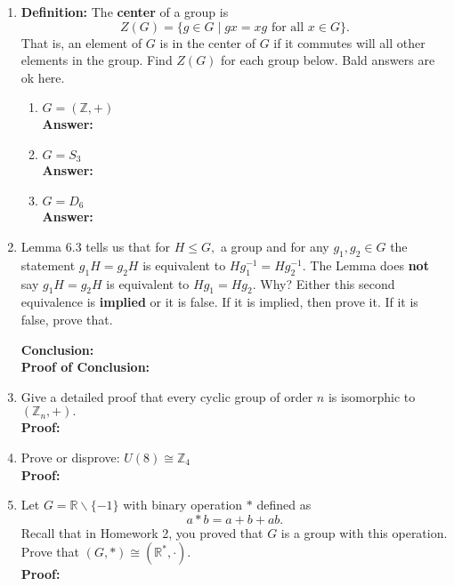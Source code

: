 \documentclass[12pt]{article}
\renewcommand{\emph}[1]{\textsf{\textbf{#1}}}
\newcommand{\bbZ}{\mathbb{Z}}
\newcommand{\bbR}{\mathbb{R}}
\begin{document}
\begin{enumerate}
\item \textbf{Definition:}  The \emph{center} of a group is 
$$Z(G)=\{g \in G \; | \; gx=xg \text{  for all   } x \in G\}.$$ That is, an element of $G$ is in the center of $G$ if it commutes will all other elements in the group. Find $Z(G)$ for each group below. Bald answers are ok here.
	\begin{enumerate}
	\item $G=(\bbZ,+)$\\
	\textbf{Answer:}
	\vfill
	\item $G=S_3$\\
	\textbf{Answer:}
	\vfill
	\item $G=D_6$\\
	\textbf{Answer:}
	\vfill
	\end{enumerate}
\item Lemma 6.3 tells us that for $H\leq G,$ a group and for any $g_1,g_2 \in G$ the statement $g_1H=g_2H$ is equivalent to $Hg_1^{-1}=Hg_2^{-1}.$ The Lemma does \emph{not} say $g_1H=g_2H$ is equivalent to $Hg_1=Hg_2.$ Why? Either this second equivalence is \emph{implied} or it is false. If it is implied, then prove it. If it is false, prove that.

\textbf{Conclusion:}\\

\textbf{Proof of Conclusion:}\\

	\vfill
\newpage
\item Give a detailed proof that every cyclic group of order $n$ is isomorphic to $(\bbZ_n,+).$\\

\textbf{Proof:}\\
\vfill
\item Prove or disprove: $U(8) \cong \bbZ_4$\\

\textbf{Proof:}\\
\vfill
\newpage

\item Let $G = \bbR \backslash \{-1\}$ with binary operation $*$ defined as 
$$a*b=a+b+ab.$$
Recall that in  Homework 2, you proved that $G$ is a group with this operation. Prove that $(G,*) \cong (\bbR^*,\cdot).$\\

\textbf{Proof:}\\
\vfill


\end{enumerate}
\end{document}
